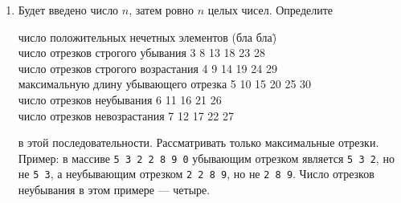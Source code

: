 \documentclass{article}
\begin{document}
\begin{enumerate}
\item
{}

\newpage
\noindent
Будет введено число $n$, затем ровно $n$ целых чисел. Определите  
\begin{tabbing}
число положительных нечетных элементов (бла бла)\=\kill
\\число отрезков строгого убывания\>\color{red}        3 8 13 18 23 28
\\число отрезков строгого возрастания\>\color{red}     4 9 14 19 24 29
\\максимальную длину убывающего отрезка\>\color{red}   5 10 15 20 25 30
\\число отрезков неубывания\>\color{red}               6 11 16 21 26
\\число отрезков невозрастания\>\color{red}            7 12 17 22 27
\end{tabbing}
в этой последовательности. Рассматривать только максимальные отрезки.
Пример: в массиве \texttt{5 3 2 2 8 9 0} убывающим отрезком является \texttt{5 3 2}, но не \texttt{5 3}, а неубывающим отрезком \texttt{2 2 8 9}, но не \texttt{2 8 9}. Число отрезков неубывания в этом примере --- четыре.

\end{enumerate}
\end{document}
